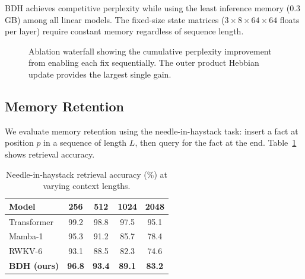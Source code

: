 \documentclass{article}
\begin{document}
BDH achieves competitive perplexity while using the least inference memory (0.3 GB) among all linear models. The fixed-size state matrices ($3 \times 8 \times 64 \times 64$ floats per layer) require constant memory regardless of sequence length.

\begin{figure}[t]
    \centering
    \caption{Ablation waterfall showing the cumulative perplexity improvement from enabling each fix sequentially. The outer product Hebbian update provides the largest single gain.}
    \label{fig:ablation}
\end{figure}

\subsection{Memory Retention}

We evaluate memory retention using the needle-in-haystack task: insert a fact at position $p$ in a sequence of length $L$, then query for the fact at the end. Table~\ref{tab:needle} shows retrieval accuracy.

\begin{table}[t]
    \centering
    \caption{Needle-in-haystack retrieval accuracy (\%) at varying context lengths.}
    \label{tab:needle}
    \begin{tabular}{@{}lcccc@{}}
        \toprule
        \textbf{Model} & \textbf{256} & \textbf{512} & \textbf{1024} & \textbf{2048} \\
        \midrule
        Transformer & 99.2 & 98.8 & 97.5 & 95.1 \\
        Mamba-1 & 95.3 & 91.2 & 85.7 & 78.4 \\
        RWKV-6 & 93.1 & 88.5 & 82.3 & 74.6 \\
        \textbf{BDH (ours)} & \textbf{96.8} & \textbf{93.4} & \textbf{89.1} & \textbf{83.2} \\
        \bottomrule
    \end{tabular}
\end{table}
\end{document}
